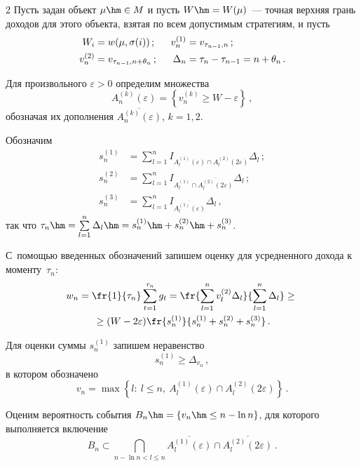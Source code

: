 \begin{multicols}{2}
  Пусть задан объект $\mu\hm\in M$ и пусть $W\hm=W(\mu)$~--- точная верхняя грань 
доходов для этого объекта, взятая по всем допустимым стратегиям, и пусть %
  \begin{alignat*}{2}
  W_i&=w(\mu,\sigma(i))\,; &\enskip v_n^{(1)}&=v_{\tau_{n-1},n}\,;\\
  v_n^{(2)}&=v_{\tau_{n-1},n+\theta_n}\,; &\enskip \Delta_n&=\tau_n-\tau_{n-1}=n+\theta_n\,.
  \end{alignat*}
  
  Для произвольного $\varepsilon>0$ определим множества
  $$
  A_n^{(k)}(\varepsilon)=\left\{ v_n^{(k)}\geq W-\varepsilon\right\}\,,
  $$
обозначая их дополнения $\overline{A_n^{(k)}(\varepsilon)}$, $k=1, 2$.
  
  Обозначим
  \begin{align*}
  s_n^{(1)} &= \sum\limits_{l=1}^n I_{A_l^{(1)}(\varepsilon)\cap 
{A_l^{(2)}(2\varepsilon)}} \Delta_l\,;\\
  s_n^{(2)} &= \sum\limits_{l=1}^n I_{A_l^{(1)}\cap 
\overline{A_l^{(2)}(2\varepsilon)}}\Delta_l\,;\\
  s_n^{(3)} &= \sum\limits_{l=1}^n I_{\overline{A_l^{(1)}(\varepsilon)}}\Delta_l\,,
  \end{align*}
так что $\tau_n\hm=\sum\limits_{l=1}^n \Delta_l\hm= s_n^{(1)}\hm+ s_n^{(2)}\hm+ 
s_n^{(3)}$.

\columnbreak

  
  С~помощью введенных обозначений запишем оценку для усредненного дохода к 
моменту~$\tau_n$:
  \begin{multline}
  w_n=\fr{1}{\tau_n}\sum\limits_{t=1}^{\tau_n} g_t=\fr{\sum\limits_{l=1}^n 
v_l^{(2)}\Delta_l} {\sum\limits_{l=1}^n \Delta_l}\geq{}\\
{}\geq (W-2\varepsilon) \fr{s_n^{(1)}} 
{s_n^{(1)}+s_n^{(2)}+s_n^{(3)}}\,.
  \label{e1-kon}
  \end{multline}
  
  Для оценки суммы $s_n^{(1)}$ запишем неравенство
  $$
  s_n^{(1)}\geq \Delta_{v_n}\,,
  $$
в котором обозначено
$$
v_n=\max\left\{ l:\ l\leq n,\ A_l^{(1)}(\varepsilon)\cap A_l^{(2)}(2\varepsilon)\right\}\,.
$$
  
  Оценим вероятность события $B_n\hm=\{v_n\hm\leq n-\ln n\}$, для которого выполняется 
включение
  $$
  B_n\subset \bigcap\limits_{n-\ln n<l\leq n} 
  \overline{A_l^{(1)}(\varepsilon)}\cap \overline{A_l^{(2)}(2\varepsilon)}\,.
  $$
  

\end{multicols}
